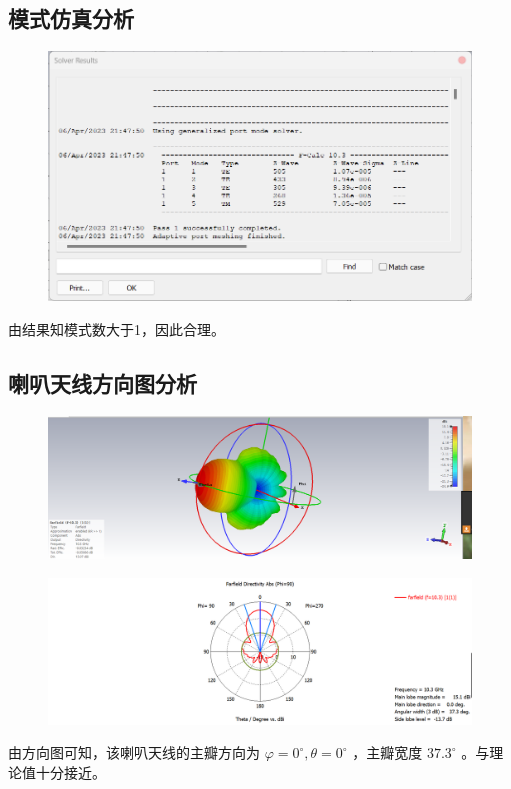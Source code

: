 \documentclass{source/Report}
\begin{document}
\subsection{模式仿真分析}
\begin{figure}[H]
    \begin{center}
        \includegraphics[width=0.8\linewidth]{pic/cb2_p13.png}
        \caption{}
    \end{center}
\end{figure}
由结果知模式数大于1，因此合理。
\subsection{喇叭天线方向图分析}
\begin{figure}[H]
    \begin{center}
        \includegraphics[width=0.8\linewidth]{pic/cb2_p14.png}
        \caption{}
    \end{center}
\end{figure}
\begin{figure}[H]
    \begin{center}
        \includegraphics[width=0.6\linewidth]{pic/cb2_p15.png}
        \caption{}
    \end{center}
\end{figure}
由方向图可知，该喇叭天线的主瓣方向为 $\varphi =0^{\circ},\theta =0^{\circ}$ ，主瓣宽度 $37.3^{\circ}$ 。与理论值十分接近。
\end{document}

